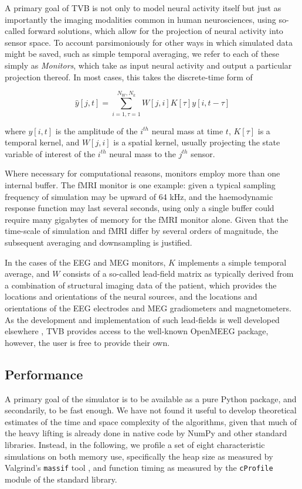 	A primary goal of TVB is not only to model neural activity itself
	but just as importantly the imaging modalities common in human 
	neurosciences, using so-called forward solutions, which allow for
	the projection of neural activity into sensor space. To account
	parsimoniously for other ways in which simulated data might be saved, 
	such as simple temporal averaging, we refer to each of these simply as 
	\textit{Monitors}, which take as input neural activity and 
	output a particular projection thereof. In most cases, this 
	takes the discrete-time form of

	\[ \hat{y}[j, t] = \sum_{i=1, \tau=1}^{N_W, N_k} W[j, i] K[\tau] y[i, t-\tau] \]

	\noindent where $y[i, t]$ is the amplitude of the $i^{th}$ neural mass at time
	$t$, $K[\tau]$ is a temporal kernel, and $W[j, i]$ is a spatial kernel,
	usually projecting the state variable of interest of the $i^{th}$ 
	neural mass to the $j^{th}$ sensor. 

	Where necessary for computational reasons, monitors employ more than 
	one internal buffer. The fMRI monitor is one 
	example: given a typical sampling frequency of simulation may be upward of 
	64 kHz, and the haemodynamic response function may last several seconds, 
	using only a single buffer could require many gigabytes of memory for the 
	fMRI monitor alone. Given that 
	the time-scale of simulation and fMRI differ by several orders of magnitude, 
	the subsequent averaging and downsampling is justified. 

	In the cases of the EEG and MEG monitors, $K$ implements a simple
	temporal average, and $W$ consists of a so-called lead-field matrix as typically
	derived from a combination of structural imaging data of the patient, 
	which provides the locations and orientations of the neural sources, and the locations
	and orientations of the EEG electrodes and MEG gradiometers and magnetometers. 
	As the development and implementation of such lead-fields is well developed
	elsewhere \citep{Sarvas_1987,Hamalainen_1989,Jirsa_2002,Nolte2003,Gramfort_2010}, TVB provides access
	to the well-known OpenMEEG package, however, the user is free to provide 
	their own.

\subsection{Performance}

	A primary goal of the simulator is to be available as a pure Python package,
	and secondarily, to be fast enough. We have not found it useful to 
	develop theoretical estimates of the time and space complexity of the 
	algorithms, given that much of the heavy lifting is already done in native
	code by NumPy and other standard libraries. Instead, 
	in the following, we profile a set of eight characteristic simulations
	on both memory use, specifically the heap size as measured by Valgrind's 
	\texttt{massif} tool \citep{nethercote2007valgrind}, 
    and function timing as measured by the 
	\texttt{cProfile} module of the standard library. 
	
